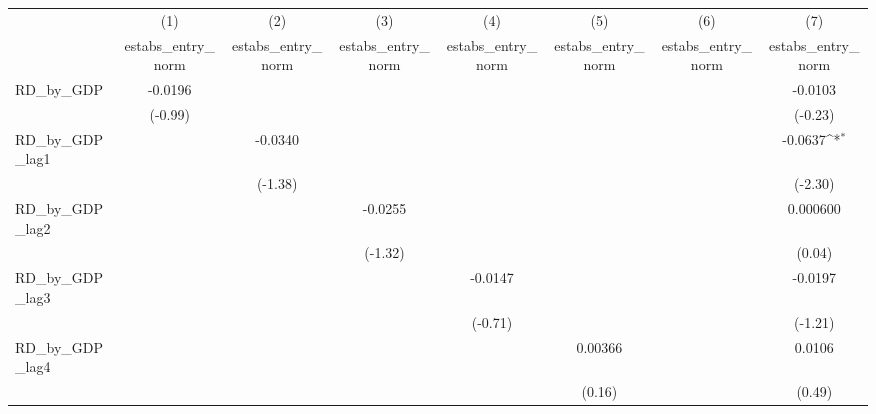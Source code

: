 {
\def\sym#1{\ifmmode^{#1}\else\(^{#1}\)\fi}
\begin{tabular}{l*{7}{c}}
\toprule
          &\multicolumn{1}{c}{(1)}&\multicolumn{1}{c}{(2)}&\multicolumn{1}{c}{(3)}&\multicolumn{1}{c}{(4)}&\multicolumn{1}{c}{(5)}&\multicolumn{1}{c}{(6)}&\multicolumn{1}{c}{(7)}\\
          &\multicolumn{1}{c}{estabs\_entry\_norm}&\multicolumn{1}{c}{estabs\_entry\_norm}&\multicolumn{1}{c}{estabs\_entry\_norm}&\multicolumn{1}{c}{estabs\_entry\_norm}&\multicolumn{1}{c}{estabs\_entry\_norm}&\multicolumn{1}{c}{estabs\_entry\_norm}&\multicolumn{1}{c}{estabs\_entry\_norm}\\
\midrule
RD\_by\_GDP &  -0.0196         &                  &                  &                  &                  &                  &  -0.0103         \\
          &  (-0.99)         &                  &                  &                  &                  &                  &  (-0.23)         \\
\addlinespace
RD\_by\_GDP\_lag1&                  &  -0.0340         &                  &                  &                  &                  &  -0.0637\sym{*}  \\
          &                  &  (-1.38)         &                  &                  &                  &                  &  (-2.30)         \\
\addlinespace
RD\_by\_GDP\_lag2&                  &                  &  -0.0255         &                  &                  &                  & 0.000600         \\
          &                  &                  &  (-1.32)         &                  &                  &                  &   (0.04)         \\
\addlinespace
RD\_by\_GDP\_lag3&                  &                  &                  &  -0.0147         &                  &                  &  -0.0197         \\
          &                  &                  &                  &  (-0.71)         &                  &                  &  (-1.21)         \\
\addlinespace
RD\_by\_GDP\_lag4&                  &                  &                  &                  &  0.00366         &                  &   0.0106         \\
          &                  &                  &                  &                  &   (0.16)         &                  &   (0.49)         \\

\end{tabular}}
